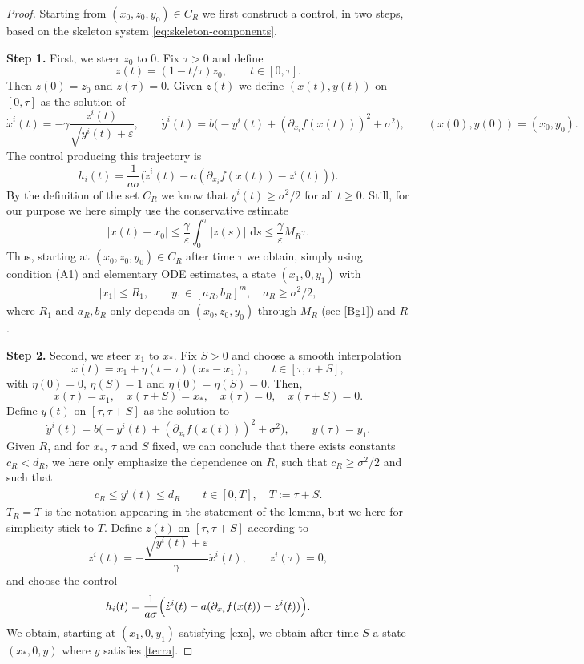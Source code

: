 \documentclass[11pt, a4paper,leqno]{amsart}
\theoremstyle{definition}
\numberwithin{equation}{section}
\def \d {{\delta}}
\renewcommand{\d}{\, \mathrm{d}} %
\begin{document}
\begin{proof}
Starting from $(x_0,z_0,y_0)\in C_R$ we first construct a control, in two steps, based on the skeleton system \eqref{eq:skeleton-components}.

\noindent
{\bf Step 1.} First, we steer $z_0$ to $0$. Fix $\tau>0$ and define
\[
z(t)=(1-{t}/{\tau})z_0,
\qquad
t\in[0,\tau].
\]
Then $z(0)=z_0$ and  $z(\tau)=0$. Given $z(t)$ we define $(x(t),y(t))$ on $[0,\tau]$ as the solution of
\[
\dot x^i(t)=
-\gamma\frac{z^i(t)}{\sqrt{y^i(t)}+\varepsilon},
\qquad
\dot y^i(t)=
b\bigl(-y^i(t)+(\partial_{x_i}f(x(t)))^2+\sigma^2\bigr),\qquad (x(0),y(0))=(x_0,y_0).
\]
The control producing this trajectory is
\[
h_i(t)=\frac1{a\sigma}
\bigl(\dot z^i(t)-a(\partial_{x_i}f(x(t))-z^i(t))\bigr).
\]
By the definition of the set $C_R$ we know that $y^i(t)\geq \sigma^2/2$ for all $t\geq 0$.  Still, for our purpose we here simply use the conservative estimate
\[
|x(t)-x_0|
\le
\frac{\gamma}{\varepsilon}
\int_0^{\tau} |z(s)|\,\d s
\le \frac{\gamma}{\varepsilon}M_R\tau .
\]
Thus, starting at $(x_0,z_0,y_0)\in C_R$ after time $\tau$ we obtain, simply using condition (A1) and elementary ODE estimates, a state $(x_1,0,y_1)$ with
\begin{align}\label{exa}
|x_1|\le R_1,
\qquad
y_1\in[a_{R},b_{R}]^m,\quad a_{R}\geq \sigma^2/2,
\end{align}
where $R_1$ and $a_{R},b_{R}$ only depends on $(x_0,z_0,y_0)$ through $M_R$ (see \eqref{Bg1}) and $R$.

\noindent
{\bf Step 2.} Second, we steer $x_1$ to $x_\ast$. Fix $S>0$ and choose a smooth interpolation
\[
x(t)=x_1+\eta(t-\tau)(x_\ast-x_1),
\qquad
t\in[\tau,\tau+S],
\]
with $\eta(0)=0$, $\eta(S)=1$ and $\dot\eta(0)=\dot\eta(S)=0$. Then,
$$x(\tau)=x_1,\quad x(\tau+S)=x_\ast,\quad \dot x(\tau)=0,\quad \dot x(\tau+S)=0.$$
Define $y(t)$ on $[\tau,\tau+S]$
as the solution  to
\[
\dot y^i(t)=
b\bigl(-y^i(t)+(\partial_{x_i}f(x(t)))^2+\sigma^2\bigr),
\qquad
y(\tau)=y_1 .
\]
Given $R$, and for $x_\ast$, $\tau$ and $S$ fixed, we can conclude that there exists constants $c_R<d_R$, we here only emphasize the dependence  on $R$, such that $c_R\geq \sigma^2/2$ and such that
\begin{align}\label{terra}
c_R\le y^i(t)\le d_R\qquad
t\in[0,T],\quad T:=\tau+S.
\end{align}
$T_R=T$ is the notation appearing in the statement of the lemma, but we here for simplicity stick to $T$.  Define $z(t)$ on $[\tau,\tau+S]$ according  to
\[
z^i(t)=
-\frac{\sqrt{y^i(t)}+\varepsilon}{\gamma}\dot x^i(t), \qquad
z^i(\tau)=0,
\]
and choose the control
\[
h_i(t)=\frac1{a\sigma}
\Bigl(\dot z^i(t)-a(\partial_{x_i}f(x(t))-z^i(t))\Bigr).
\]
We obtain, starting at $(x_1,0,y_1)$ satisfying \eqref{exa}, we obtain after time $S$ a state $(x_\ast,0,y)$
where $y$ satisfies \eqref{terra}.



\end{proof}
\end{document}

